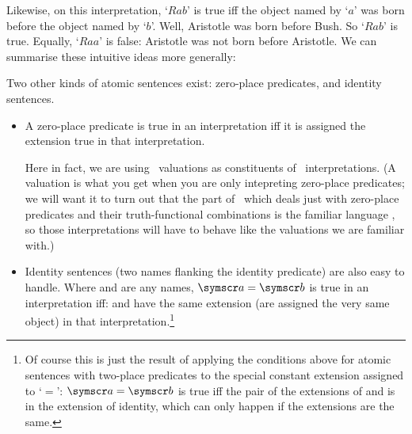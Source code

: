 \begin{earg}
Likewise, on this interpretation, `$Rab$' is true iff the object named by `$a$' was born before the object named by `$b$'. Well, Aristotle was born before Bush. So `$Rab$' is true. Equally, `$Raa$' is false: Aristotle was not born before Aristotle. We can summarise these intuitive ideas more generally:

Two other kinds of atomic sentences exist: zero-place predicates, and identity sentences.
\begin{itemize}
	\item A zero-place predicate is true in an interpretation iff it is assigned the extension true in that interpretation.

	Here in fact, we are using \TFL\ valuations as constituents of \FOL\ interpretations. (A valuation is what you get when you are only intepreting zero-place predicates; we will want it to turn out that the part of \FOL\ which deals just with zero-place predicates and their truth-functional combinations is the familiar language \TFL, so those interpretations will have to behave like the valuations we are familiar with.)
		\item Identity sentences (two names flanking the identity predicate) are also easy to handle. Where  and  are any names, $\meta{a} = \meta{b}$ is true in an interpretation  iff:
		  and  have the same extension (are assigned the very same object) in that interpretation.\footnote{Of course this is just the result of applying the conditions above for atomic sentences with two-place predicates to the special constant extension assigned to `$=$': $\meta{a}=\meta{b}$ is true iff the pair of the extensions of  and  is in the extension of identity, which can only happen if the extensions are the same.}


\end{itemize}
\end{earg}
